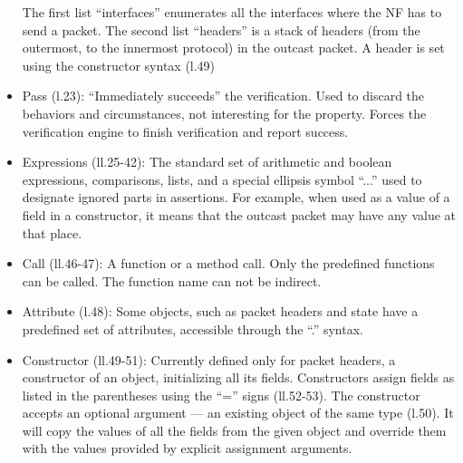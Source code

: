 \documentclass[]{report}
\begin{document}
\begin{itemize}
    The first list ``interfaces'' enumerates all the interfaces where the NF has to send a packet.
    The second list ``headers'' is a stack of headers (from the outermost, to the innermost protocol) in the outcast packet.
    A header is set using the constructor syntax (l.49)
  \item Pass (l.23): ``Immediately succeeds'' the verification.
    Used to discard the behaviors and circumstances, not interesting for the property.
    Forces the verification engine to finish verification and report success.
  \item Expressions (ll.25-42): The standard set of arithmetic and boolean expressions, comparisons, lists, and a special ellipsis symbol ``...'' used to designate ignored parts in assertions.
    For example, when used as a value of a field in a constructor, it means that the outcast packet may have any value at that place.
  \item Call (ll.46-47): A function or a method call.
    Only the predefined functions can be called.
    The function name can not be indirect.
  \item Attribute (l.48): Some objects, such as packet headers and state have a predefined set of attributes, accessible through the ``.'' syntax.
  \item Constructor (ll.49-51): Currently defined only for packet headers, a constructor of an object, initializing all its fields.
    Constructors assign fields as listed in the parentheses using the ``='' signs (ll.52-53).
    The constructor accepts an optional argument --- an existing object of the same type (l.50).
    It will copy the values of all the fields from the given object and override them with the values provided by explicit assignment arguments.

\end{itemize}
\end{document}
